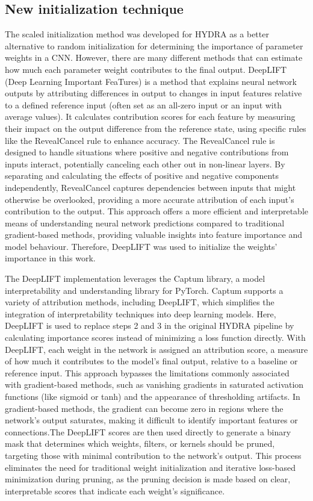 \documentclass[journal,onecolumn,12pt]{IEEEtran}
\begin{document}
\subsection{New initialization technique}
The scaled initialization method was developed for HYDRA as a better alternative to random initialization for determining the importance of parameter weights in a CNN. However, there are many different methods that can estimate how much each parameter weight contributes to the final output. DeepLIFT (Deep Learning Important FeaTures) is a method that explains neural network outputs by attributing differences in output to changes in input features relative to a defined reference input (often set as an all-zero input or an input with average values). It calculates contribution scores for each feature by measuring their impact on the output difference from the reference state, using specific rules like the RevealCancel rule to enhance accuracy. The RevealCancel rule is designed to handle situations where positive and negative contributions from inputs interact, potentially canceling each other out in non-linear layers. By separating and calculating the effects of positive and negative components independently, RevealCancel captures dependencies between inputs that might otherwise be overlooked, providing a more accurate attribution of each input’s contribution to the output. This approach offers a more efficient and interpretable means of understanding neural network predictions compared to traditional gradient-based methods, providing valuable insights into feature importance and model behaviour. Therefore, DeepLIFT was used to initialize the weights' importance in this work. 

The DeepLIFT implementation leverages the Captum library, a model interpretability and understanding library for PyTorch. Captum supports a variety of attribution methods, including DeepLIFT, which simplifies the integration of interpretability techniques into deep learning models. Here, DeepLIFT is used to replace steps 2 and 3 in the original HYDRA pipeline by calculating importance scores instead of minimizing a loss function directly. With DeepLIFT, each weight in the network is assigned an attribution score, a measure of how much it contributes to the model’s final output, relative to a baseline or reference input. This approach bypasses the limitations commonly associated with gradient-based methods, such as vanishing gradients in saturated activation functions (like sigmoid or tanh) and the appearance of thresholding artifacts. In gradient-based methods, the gradient can become zero in regions where the network’s output saturates, making it difficult to identify important features or connections.The DeepLIFT scores are then used directly to generate a binary mask that determines which weights, filters, or kernels should be pruned, targeting those with minimal contribution to the network's output. This process eliminates the need for traditional weight initialization and iterative loss-based minimization during pruning, as the pruning decision is made based on clear, interpretable scores that indicate each weight’s significance.
\end{document}
